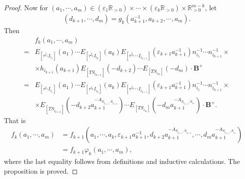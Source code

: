 \documentclass[10pt,a4paper]{amsart}
\begin{document}
\begin{proof}
    Now for $(a_1,\cdots,a_m)\in (\varepsilon_1\mathbb{R}_{>0})\times \cdots \times (\varepsilon_k\mathbb{R}_{>0})\times \mathbb{R}_{>0}^{m-k}$, let
    \begin{align*}
       (d_{k+1},\cdots,d_m)=g_k(a_{k+1}^{-1},a_{k+2},\cdots,a_m) .
    \end{align*}
     Then 
    \begin{align*}
    &f_k(a_1,\cdots,a_m)\\
    =&E_{[\tau^{j_1}I_{i_1}]}(a_1) \cdots E_{[\tau^{j_k}I_{i_k}]}(a_k) E_{[\tau^{j_{k+1}}I_{i_{k+1}}]}(\varepsilon_{k+1}a_{k+1}^{-1}) n_{i_1}^{-1}\cdots n_{i_{k+1}}^{-1}\times \\ 
    & \times h_{i_{k+1}}(a_{k+1})  E_{[TS_{i_{k+2}}]}(-d_{k+2}) \cdots E_{[TS_{i_m}]}(-d_m) \cdot \mathbf{B}^+\\
    =&E_{[\tau^{j_1}I_{i_1}]}(a_1) \cdots E_{[\tau^{j_k}I_{i_k}]}(a_k) E_{[\tau^{j_{k+1}}I_{i_{k+1}}]}(\varepsilon_{k+1}a_{k+1}^{-1}) n_{i_1}^{-1}\cdots n_{i_{k+1}}^{-1}\times \\ 
     & \times  E_{[TS_{i_{k+2}}]}(-d_{k+2}a_{k+1}^{-A_{S_{i_{k+1}},S_{i_{k+2}}}}) \cdots E_{[TS_{i_m}]}(-d_ma_{k+1}^{-A_{S_{i_{k+1}},S_{i_m}}}) \cdot \mathbf{B}^+.
    \end{align*}
    That is 
    \begin{align*}
        f_k(a_1,\cdots,a_m)&=f_{k+1}(a_1,\cdots,a_k,\varepsilon_{k+1}a_{k+1}^{-1},d_{k+2}a_{k+1}^{-A_{S_{i_{k+1}},S_{i_{k+2}}}},\cdots,d_ma_{k+1}^{-A_{S_{i_{k+1}},S_{i_m}}})\\
        &=f_{k+1}\varphi_k(a_1,\cdots,a_m),
    \end{align*}
    where the last equality follows from definitions and inductive calculations. 
    The proposition is proved.
\end{proof}
\end{document}
